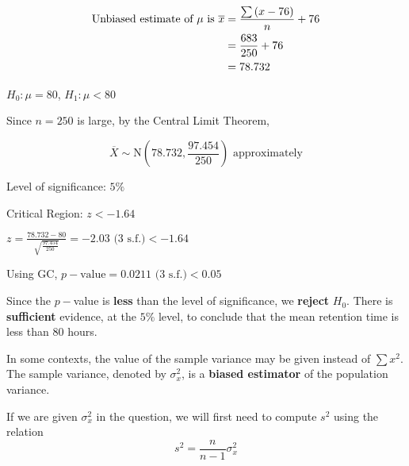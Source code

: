 \documentclass[11pt,a4paper]{book}
\begin{document}
\begin{example}
\begin{enumerate}[label=(\alph*)]
\begin{align*}
\text{Unbiased estimate of \ensuremath{\mu} is }\overline{x} & =\frac{\sum\left(x-76\right)}{n}+76\\
 & =\frac{683}{250}+76\\
 & =78.732
\end{align*}

$H_{0}:\mu=80$, $H_{1}:\mu<80$

Since $n=250$ is large, by the Central Limit Theorem,

\[
\overline{X}\sim\text{N}\left(78.732,\frac{97.454}{250}\right)\text{ approximately}
\]

Level of significance: $5\%$

Critical Region: $z<-1.64$

${\displaystyle z=\frac{78.732-80}{\sqrt{\frac{97.454}{250}}}}=-2.03\text{ (3 s.f.)}<-1.64$

Using GC, $p-\text{value}=0.0211\text{ (3 s.f.)}<0.05$

\begin{tcolorbox}[colback=white, colframe=black,boxrule=.4pt, sharpish corners]

Since the $p-$value is \textbf{less} than the level of significance,
we \textbf{reject} $H_{0}$. There is \textbf{sufficient} evidence,
at the $5\%$ level, to conclude that the mean retention time is less
than 80 hours.
\end{tcolorbox}

\end{enumerate}

\end{example}

\newpage

In some contexts, the value of the sample variance may be given instead of $\sum x^{2}$. The sample variance, denoted by $\sigma_{x}^{2}$, is a \textbf{biased estimator} of the population variance.

If we are given $\sigma_{x}^{2}$ in the question, we will first need
to compute $s^{2}$ using the relation 
\[
s^{2}=\frac{n}{n-1}\sigma_{x}^{2}
\]
\end{document}
